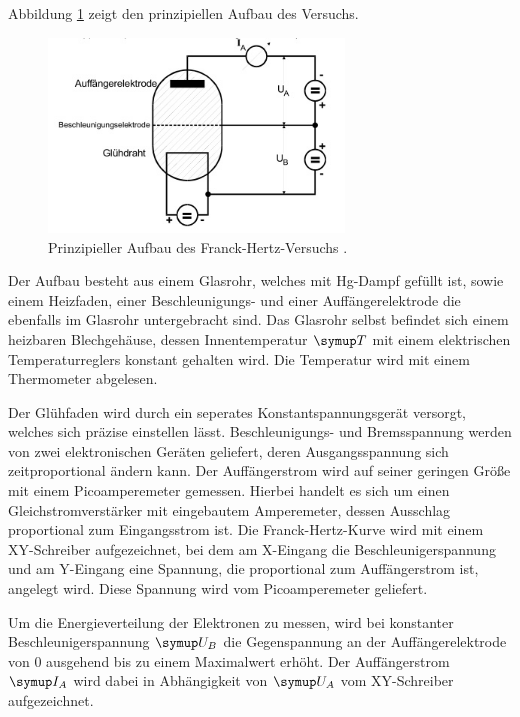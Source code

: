 Abbildung \ref{fig:aufbau} zeigt den prinzipiellen Aufbau des Versuchs.
\begin{figure}
  \centering
  \includegraphics[width=0.7\textwidth]{bilder/aufbau.jpg}
  \caption{Prinzipieller Aufbau des Franck-Hertz-Versuchs \cite{601}.}
  \label{fig:aufbau}
\end{figure}
Der Aufbau besteht aus einem Glasrohr, welches mit Hg-Dampf gefüllt ist,
sowie einem Heizfaden, einer Beschleunigungs- und einer Auffängerelektrode
die ebenfalls im Glasrohr untergebracht sind.
Das Glasrohr selbst befindet sich einem heizbaren Blechgehäuse, dessen
Innentemperatur $\su{T}$ mit einem elektrischen Temperaturreglers konstant
gehalten wird. Die Temperatur wird mit einem Thermometer abgelesen.

Der Glühfaden wird durch ein seperates Konstantspannungsgerät versorgt, welches
sich präzise einstellen lässt. Beschleunigungs- und Bremsspannung werden von
zwei elektronischen Geräten geliefert, deren Ausgangsspannung sich
zeitproportional ändern kann. Der Auffängerstrom wird auf seiner geringen Größe
mit einem Picoamperemeter gemessen. Hierbei handelt es sich um einen
Gleichstromverstärker mit eingebautem Amperemeter, dessen Ausschlag proportional
zum Eingangsstrom ist. Die Franck-Hertz-Kurve wird mit einem XY-Schreiber
aufgezeichnet, bei dem am X-Eingang die Beschleunigerspannung und am Y-Eingang
eine Spannung, die proportional zum Auffängerstrom ist, angelegt wird. Diese
Spannung wird vom Picoamperemeter geliefert.

Um die Energieverteilung der
Elektronen zu messen, wird bei konstanter Beschleunigerspannung $\su{U_B}$ die
Gegenspannung an der Auffängerelektrode von 0 ausgehend bis zu einem Maximalwert
erhöht. Der Auffängerstrom $\su{I_A}$ wird dabei in Abhängigkeit von $\su{U_A}$
vom XY-Schreiber aufgezeichnet.

